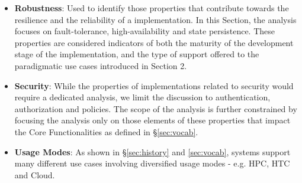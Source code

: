 \documentclass{sig-alternate}
\begin{document}
\begin{itemize}

\item \textbf{Robustness}: Used to identify those properties that
  contribute towards the resilience and the reliability of a \pilotjob
  implementation. In this Section, the analysis focuses on
  fault-tolerance, high-availability and state persistence. These
  properties are considered indicators of both the maturity of the
  development stage of the \pilotjob implementation, and the type of
  support offered to the paradigmatic use cases introduced in Section
  2. 

\item \textbf{Security}: While the properties of \pilotjob
  implementations related to security would require a dedicated
  analysis, we limit the discussion to authentication, authorization
  and policies. The scope of the analysis is further constrained by
  focusing the analysis only on those elements of these properties
  that impact the Core Functionalities as defined in
  \S\ref{sec:vocab}.

\item \textbf{Usage Modes}: As shown in \S\ref{sec:history} and 
\ref{sec:vocab}, \pilotjob systems support many different use cases involving
diversified usage modes - e.g. HPC, HTC and Cloud.







\end{itemize}
\end{document}
